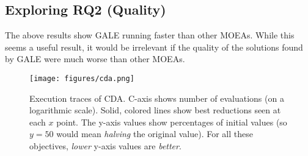 \documentclass[10pt,journal,compsoc]{IEEEtran}
\begin{document}

\subsection{Exploring RQ2 (Quality)}

The above results show GALE running faster than other MOEAs.
While this seems a useful result, it would be irrelevant if
the quality of the solutions found by GALE were much worse than other MOEAs.



\begin{figure}
\texttt{[image: figures/cda.png]}
\caption{Execution traces of CDA. C-axis shows number
of evaluations (on a logarithmic scale). 
Solid, colored lines  show  best reductions seen
at each $x$ point.
The y-axis values show percentages of initial values
(so $y=50$ would mean {\em halving} the original value).
For all these
objectives, {\em lower} y-axis values are {\em better}.
}\label{fig:cda} 
\end{figure}
\end{document}
